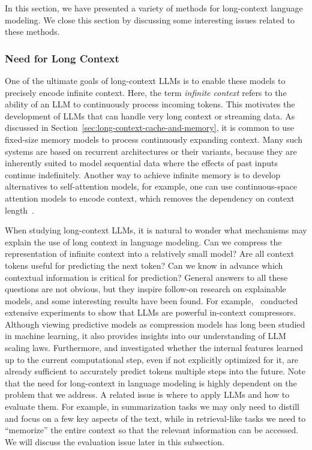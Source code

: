 \noindent In this section, we have presented a variety of methods for long-context language modeling. We close this section by discussing some interesting issues related to these methods.

\subsubsection{Need for Long Context}

\noindent One of the ultimate goals of long-context LLMs is to enable these models to precisely encode infinite context. Here, the term \textit{infinite context} refers to the ability of an LLM to continuously process incoming tokens. This motivates the development of LLMs that can handle very long context or streaming data. As discussed in Section~\ref{sec:long-context-cache-and-memory}, it is common to use fixed-size memory models to process continuously expanding context. Many such systems are based on recurrent architectures or their variants, because they are inherently suited to model sequential data where the effects of past inputs continue indefinitely. Another way to achieve infinite memory is to develop alternatives to self-attention models, for example, one can use continuous-space attention models to encode context, which removes the dependency on context length~\cite{martins-etal:2022former}.

When studying long-context LLMs, it is natural to wonder what mechanisms may explain the use of long context in language modeling. Can we compress the representation of infinite context into a relatively small model? Are all context tokens useful for predicting the next token? Can we know in advance which contextual information is critical for prediction? General answers to all these questions are not obvious, but they inspire follow-on research on explainable models, and some interesting results have been found. For example,~\citet{deletang-etal:2024language} conducted extensive experiments to show that LLMs are powerful in-context compressors. Although viewing predictive models as compression models has long been studied in machine learning, it also provides insights into our understanding of LLM scaling laws. Furthermore, \citet{pal-etal:2023future} and \citet{wu-etal:2024language} investigated whether the internal features learned up to the current computational step, even if not explicitly optimized for it, are already sufficient to accurately predict tokens multiple steps into the future. Note that the need for long-context in language modeling is highly dependent on the problem that we address. A related issue is where to apply LLMs and how to evaluate them. For example, in summarization tasks we may only need to distill and focus on a few key aspects of the text, while in retrieval-like tasks we need to ``memorize'' the entire context so that the relevant information can be accessed. We will discuss the evaluation issue later in this subsection.

